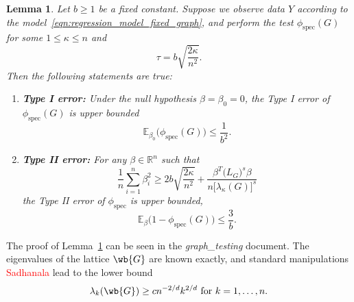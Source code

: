 \documentclass{article}
\newcommand{\Reals}{\mathbb{R}}
\newcommand{\1}{\mathbf{1}}
\newcommand{\spec}{\mathrm{spec}}
\theoremstyle{alden}
\theoremstyle{aldenthm}
\newtheorem{lemma}{Lemma}
\theoremstyle{definition}
\theoremstyle{remark}
\begin{document}
\begin{lemma}
	\label{lem:fixed_graph_testing}
	Let $b \geq 1$ be a fixed constant. Suppose we observe data $Y$ according to the model~\eqref{eqn:regression_model_fixed_graph}, and perform the test $\phi_{\spec}(G)$ for some $1 \leq \kappa \leq n$ and
	\begin{equation*}
	\tau = b\sqrt{\frac{2\kappa}{n^2}}.
	\end{equation*}
	Then the following statements are true:
	\begin{enumerate}
		\item \textbf{Type I error:} Under the null hypothesis $\beta = \beta_0 = 0$, the Type I error of $\phi_{\spec}(G)$ is upper bounded
		\begin{equation}
		\label{eqn:graph_spectral_type_I_error}
		\mathbb{E}_{\beta_0}\bigl(\phi_{\spec}(G)\bigr) \leq \frac{1}{b^2}.
		\end{equation}
		\item \textbf{Type II error:} For any $\beta \in \Reals^n$ such that
		\begin{equation}
		\label{eqn:fixed_graph_testing_critical_radius}
		\frac{1}{n} \sum_{i = 1}^{n} \beta_i^2 \geq 2b\sqrt{\frac{2\kappa}{n^2}} + \frac{\beta^T \bigl(L_G\bigr)^s \beta}{n\bigl[\lambda_{\kappa}(G)\bigr]^s}
		\end{equation}
		the Type II error of $\phi_{\spec}$ is upper bounded,
		\begin{equation}
		\label{eqn:graph_spectral_type_II_error}
		\mathbb{E}_{\beta}\bigl(1 - \phi_{\spec}(G)\bigr) \leq \frac{3}{b}.
		\end{equation}
	\end{enumerate}
\end{lemma}
The proof of Lemma~\ref{lem:fixed_graph_testing} can be seen in the \textit{graph\_testing} document. The eigenvalues of the lattice $\wb{G}$ are known exactly, and standard manipulations \textcolor{red}{Sadhanala} lead to the lower bound
\begin{equation}
\label{eqn:eigenvalue_tail_bound_grid}
\lambda_k(\wb{G}) \geq c n^{-2/d}k^{2/d}~\textrm{for $k = 1,\ldots,n$.}
\end{equation}
\end{document}
